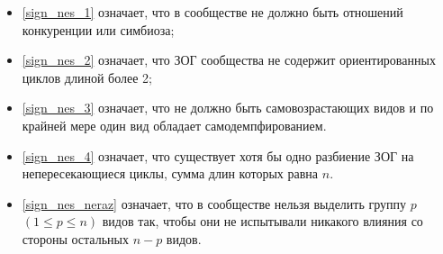     \begin{itemize}
        \item \eqref{sign_nes_1} означает, что в сообществе не должно быть отношений конкуренции или симбиоза;
        \item \eqref{sign_nes_2} означает, что ЗОГ сообщества не содержит ориентированных циклов длиной более 2;
        \item \eqref{sign_nes_3} означает, что не должно быть самовозрастающих видов и по крайней мере один вид обладает самодемпфированием.
        \item \eqref{sign_nes_4} означает, что существует хотя бы одно разбиение ЗОГ на непересекающиеся циклы, сумма длин которых равна \(n\).
        \item \eqref{sign_nes_neraz} означает, что в сообществе нельзя выделить группу \(p\) \( (1 \leq p \leq n)\) видов так, чтобы они не испытывали никакого влияния со стороны остальных \(n-p\) видов.
    \end{itemize}




